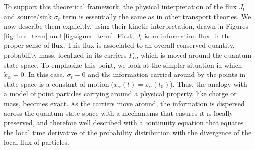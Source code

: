 \documentclass[draft,nofootinbib,pre,twocolumn,showpacs,showkeys,preprintnumbers,floatfix]{revtex4-1}
\newcommand{\1}{\mathbbm{1}}
\begin{document}
To support this theoretical framework, the physical interpretation of the flux $J_t$ and source/sink $\sigma_t$ term is essentially the 
same as in other transport theories. We now describe them explicitly, using their kinetic interpretation, drawn
in Figures \ref{fig:flux_term} and \ref{fig:sigma_term}. First, $J_t$ is an information flux, in the proper sense of flux. 
This flux is associated to an overall conserved quantity, probability mass, localized in its carriers $\Gamma_\alpha$, which 
is moved around the quantum state space. To emphasize this point, we look at the simpler situation in which $\dot{x}_\alpha = 0$. 
In this case, $\sigma_t=0$ and the information carried around by the points in state space is a constant of motion 
($x_\alpha(t)= x_\alpha(t_0)$). Thus, the analogy with a model of point particles carrying around a physical property, 
like charge or mass, becomes exact. As the carriers move around, the information is dispersed across the quantum 
state space with a mechanisms that ensures it is locally preserved, and therefore well described with a continuity 
equation that equates the local time derivative of the probability distribution with the divergence of the local flux of 
particles.
\end{document}
